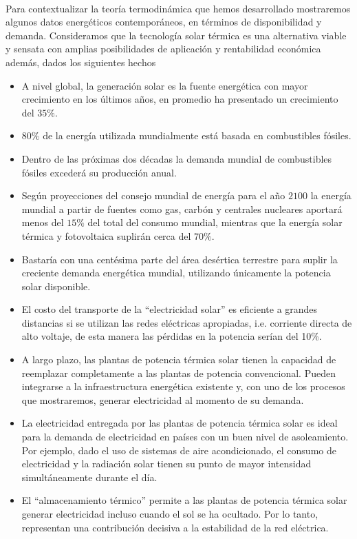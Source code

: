 \documentclass{article}
\theoremstyle{definition} \newtheorem{defi}{Definici\'on}
\theoremstyle{definition} \newtheorem{teo}{Teorema}
\theoremstyle{definition} \newtheorem{cor}{Corolario}
\begin{document}
\paragraph{}
Para contextualizar la teor\'ia termodin\'amica que hemos desarrollado mostraremos algunos datos energ\'eticos contempor\'aneos, en t\'erminos de disponibilidad y demanda. Consideramos que la tecnolog\'ia solar t\'ermica es una alternativa viable y sensata con amplias posibilidades de aplicaci\'on y rentabilidad econ\'omica adem\'as, dados los siguientes hechos \cite{l2}
\begin{itemize}
\item A nivel global, la generaci\'on solar es la fuente energ\'etica con mayor crecimiento en los \'ultimos a\~nos, en promedio ha presentado un crecimiento del $35\%.$
\item $80\%$ de la energ\'ia utilizada mundialmente est\'a basada en combustibles f\'osiles.
\item Dentro de las pr\'oximas dos d\'ecadas la demanda mundial de combustibles f\'osiles exceder\'a su producci\'on anual.
\item Seg\'un proyecciones del consejo mundial de energ\'ia para el a\~no $2100$ la energ\'ia mundial a partir de fuentes como gas, carb\'on y centrales nucleares aportar\'a menos del $15\%$ del total del consumo mundial, mientras que la energ\'ia solar t\'ermica y fotovoltaica suplir\'an cerca del $70\%.$
\item Bastar\'ia con una cent\'esima parte del \'area des\'ertica terrestre para suplir la creciente demanda energ\'etica mundial, utilizando \'unicamente la potencia solar disponible.
\item El costo del transporte de la ``electricidad solar'' es eficiente a grandes distancias si se utilizan las redes el\'ectricas apropiadas, i.e. corriente directa de alto voltaje, de esta manera las p\'erdidas en la potencia ser\'ian del 10\%.
\item A largo plazo, las plantas de potencia t\'ermica solar tienen la capacidad de reemplazar completamente a las plantas de potencia convencional. Pueden integrarse a la infraestructura energ\'etica existente y, con uno de los procesos que mostraremos, generar electricidad al momento de su demanda.
\item La electricidad entregada por las plantas de potencia t\'ermica solar es ideal para la demanda de electricidad en pa\'ises con un buen nivel de asoleamiento. Por ejemplo, dado el uso de sistemas de aire acondicionado, el consumo de electricidad y la radiaci\'on solar tienen su punto de mayor intensidad simult\'aneamente durante el d\'ia.
\item El ``almacenamiento t\'ermico'' permite a las plantas de potencia t\'ermica solar generar electricidad incluso cuando el sol se ha ocultado. Por lo tanto, representan una contribuci\'on decisiva a la estabilidad de la red el\'ectrica.
\end{itemize}
\end{document}
